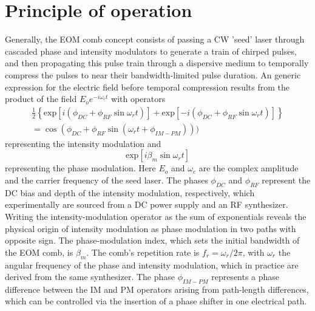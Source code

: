 \section{Principle of operation}
Generally, the EOM comb concept consists of passing a CW 'seed' laser through cascaded phase and intensity modulators to generate a train of chirped pulses, and then propagating this pulse train through a dispersive medium to temporally compress the pulses to near their bandwidth-limited pulse duration. An generic expression for the electric field before temporal compression results from the product of the field $E_oe^{-i\omega_ct}$ with operators
\begin{align} \frac{1}{2}\left\{\mathrm{exp}\left[i(\phi_{DC}+\phi_{RF}\sin{\omega_rt})\right]+\mathrm{exp}\left[-i(\phi_{DC}+\phi_{RF}\sin{\omega_rt})\right]\right\}\\
=\cos\left(\phi_{DC}+\phi_{RF} \sin(\omega_rt+\phi_{IM-PM})\right))
\end{align} representing the intensity modulation and 
\begin{equation}
\mathrm{exp}\left[i\beta_m \sin{\omega_r t}\right]
\end{equation} representing the phase modulation. Here $E_o$ and $\omega_c$ are the complex amplitude and the carrier frequency of the seed laser. The phases  $\phi_{DC}$ and $\phi_{RF}$ represent the DC bias and depth of the intensity modulation, respectively, which experimentally are sourced from a DC power supply and an RF synthesizer. Writing the intensity-modulation operator as the sum of exponentials reveals the physical origin of intensity modulation as phase modulation in two paths with opposite sign. The phase-modulation index, which sets the initial bandwidth of the EOM comb, is $\beta_m$. The comb's repetition rate is $f_r=\omega_r/2\pi$, with $\omega_r$ the angular frequency of the phase and intensity modulation, which in practice are derived from the same synthesizer. The phase $\phi_{IM-PM}$ represents a phase difference between the IM and PM operators arising from path-length differences, which can be controlled via the insertion of a phase shifter in one electrical path. 

